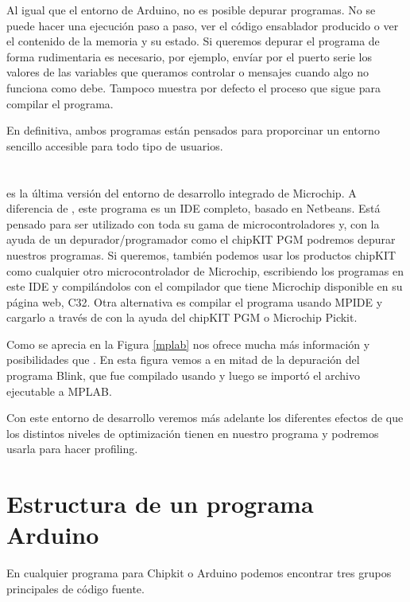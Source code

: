 Al igual que el entorno de Arduino, no es posible depurar programas.  No se puede hacer una ejecución paso a paso, ver el código ensablador producido o ver el contenido de la memoria y su estado.  Si queremos depurar el programa de forma rudimentaria es necesario, por ejemplo, envíar por el puerto serie los valores de las variables que queramos controlar o mensajes cuando algo no funciona como debe. Tampoco muestra por defecto el proceso que sigue para compilar el programa.

En definitiva, ambos programas están pensados para proporcinar un entorno sencillo accesible para todo tipo de usuarios.

\section{} 
\cite{website:mplab} es la última versión del entorno de desarrollo integrado de Microchip. A diferencia de
, este programa es un IDE completo, basado en Netbeans.  Está pensado para ser utilizado con toda su gama de microcontroladores y, con la ayuda de un depurador/programador como el chipKIT PGM podremos depurar nuestros programas.  Si queremos, también podemos usar los productos chipKIT como cualquier otro microcontrolador de Microchip, escribiendo los programas en este IDE y compilándolos con el compilador que tiene Microchip disponible en su página web, C32\cite{website:c32}.  Otra alternativa es compilar el programa usando MPIDE y cargarlo a través de  con la ayuda del chipKIT PGM o Microchip Pickit.

Como se aprecia en la Figura \ref{mplab}  nos ofrece mucha más información y posibilidades que .  En esta figura vemos a  en mitad de la depuración del programa Blink, que fue compilado usando  y luego se importó el archivo ejecutable a MPLAB.

Con este entorno de desarrollo veremos más adelante los diferentes efectos de que los distintos niveles de optimización tienen en nuestro programa y podremos usarla para hacer profiling.


\section{Estructura de un programa Arduino}
En cualquier programa para Chipkit o Arduino podemos encontrar tres grupos principales de código fuente.
